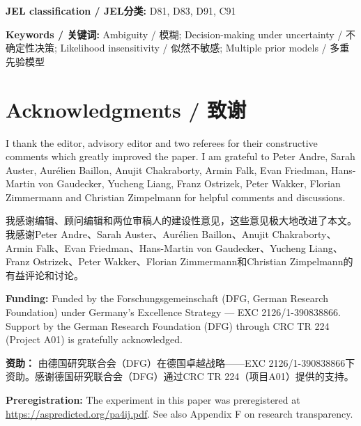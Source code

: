 \documentclass[12pt,a4paper]{article}
\newenvironment{original}
  {\par\medskip\noindent\color{black}\ignorespaces}
  {\par\medskip}
\newenvironment{translation}
  {\par\noindent\color{transblue}\ignorespaces}
  {\par\medskip\medskip}
\begin{document}
\bigskip
\noindent\textbf{JEL classification / JEL分类:} D81, D83, D91, C91

\noindent\textbf{Keywords / 关键词:} Ambiguity / 模糊; Decision-making under uncertainty / 不确定性决策; Likelihood insensitivity / 似然不敏感; Multiple prior models / 多重先验模型

\newpage

\section*{Acknowledgments / 致谢}

\begin{original}
I thank the editor, advisory editor and two referees for their constructive comments which greatly improved the paper. I am grateful to Peter Andre, Sarah Auster, Aur\'{e}lien Baillon, Anujit Chakraborty, Armin Falk, Evan Friedman, Hans-Martin von Gaudecker, Yucheng Liang, Franz Ostrizek, Peter Wakker, Florian Zimmermann and Christian Zimpelmann for helpful comments and discussions.
\end{original}

\begin{translation}
我感谢编辑、顾问编辑和两位审稿人的建设性意见，这些意见极大地改进了本文。我感谢Peter Andre、Sarah Auster、Aur\'{e}lien Baillon、Anujit Chakraborty、Armin Falk、Evan Friedman、Hans-Martin von Gaudecker、Yucheng Liang、Franz Ostrizek、Peter Wakker、Florian Zimmermann和Christian Zimpelmann的有益评论和讨论。
\end{translation}

\begin{original}
\textbf{Funding:} Funded by the Forschungsgemeinschaft (DFG, German Research Foundation) under Germany's Excellence Strategy --- EXC 2126/1-390838866. Support by the German Research Foundation (DFG) through CRC TR 224 (Project A01) is gratefully acknowledged.
\end{original}

\begin{translation}
\textbf{资助：} 由德国研究联合会（DFG）在德国卓越战略——EXC 2126/1-390838866下资助。感谢德国研究联合会（DFG）通过CRC TR 224（项目A01）提供的支持。
\end{translation}

\begin{original}
\textbf{Preregistration:} The experiment in this paper was preregistered at \url{https://aspredicted.org/pa4ij.pdf}. See also Appendix F on research transparency.
\end{original}
\end{document}
